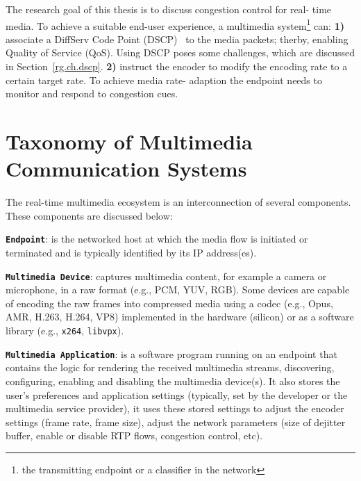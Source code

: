 
The research goal of this thesis is to discuss congestion control for real-
time media. To achieve a suitable end-user experience, a multimedia
system\footnote{the transmitting endpoint or a classifier in the network} can:
\textbf{1)} associate a DiffServ Code Point (DSCP)~\cite{rfc2474} to the media
packets; therby, enabling Quality of Service (QoS). Using DSCP poses some
challenges, which are discussed in Section~\ref{rg.ch.dscp}. \textbf{2)}
instruct the encoder to modify the encoding rate to a certain target rate. To
achieve media rate- adaption the endpoint needs to monitor and respond to
congestion cues.



\section{Taxonomy of Multimedia Communication Systems}

The real-time multimedia ecosystem is an interconnection of several
components. These components are discussed below:

\textbf{\texttt{Endpoint}}: is the networked host at which the media flow is initiated
or terminated and is typically identified by its IP address(es).


\textbf{\texttt{Multimedia Device}}: captures multimedia content, for example a camera
or microphone, in a raw format (e.g., PCM, YUV, RGB). Some devices are capable
of encoding the raw frames into compressed media using a codec (e.g., Opus,
AMR, H.263, H.264, VP8) implemented in the hardware (silicon) or as a software
library (e.g., \texttt{x264}, \texttt{libvpx}).


\textbf{\texttt{Multimedia Application}}: is a software program running on an endpoint
that contains the logic for rendering the received multimedia streams,
discovering, configuring, enabling and disabling the multimedia device(s). It
also stores the user's preferences and application settings (typically, set by
the developer or the multimedia service provider), it uses these stored
settings to adjust the encoder settings (frame rate, frame size), adjust the
network parameters (size of dejitter buffer, enable or disable RTP flows,
congestion control, etc).

